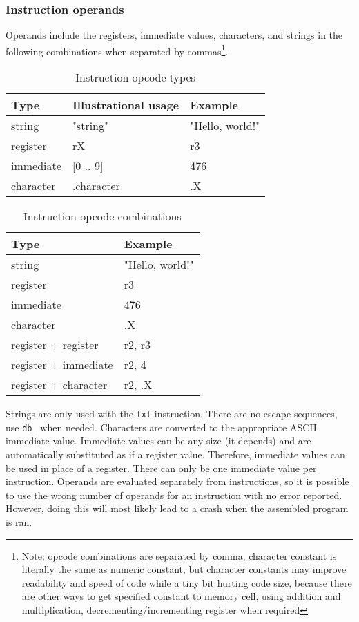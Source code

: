 \documentclass{article}
\begin{document}
\subsubsection{Instruction operands}
\par Operands include the registers, immediate values, characters, and strings in the following combinations when separated by commas\footnote{Note: opcode combinations are separated by comma, character constant is literally the same as numeric constant, but character constants may improve readability and speed of code while a tiny bit hurting code size, because there are other ways to get specified constant to memory cell, using addition and multiplication, decrementing/incrementing register when required}.

\begin{table}[h]
\centering
\caption{Instruction opcode types}
\label{tab:instropcode}
\begin{tabular}{|l|l|l|}
\hline
\textbf{Type} & \textbf{Illustrational usage} & \textbf{Example} \\ \hline
string & "string" & "Hello, world!" \\ \hline
register & rX & r3 \\ \hline
immediate & [0 .. 9] & 476 \\ \hline
character & .character & .X \\ \hline
\end{tabular}
\end{table}

\begin{table}[h]
\centering
\caption{Instruction opcode combinations}
\label{tab:instropcom}
\begin{tabular}{|l|l|}
\hline
\textbf{Type} & \textbf{Example} \\ \hline
string & "Hello, world!" \\ \hline
register & r3 \\ \hline
immediate & 476 \\ \hline
character & .X \\ \hline
register + register & r2, r3 \\ \hline
register + immediate & r2, 4 \\ \hline
register + character & r2, .X \\ \hline
\end{tabular}
\end{table}

\par Strings are only used with the \verb|txt| instruction. There are no escape sequences, use \verb|db_| when needed. Characters are converted to the appropriate ASCII immediate value. Immediate values can be any size (it depends) and are automatically substituted as if a register value. Therefore, immediate values can be used in place of a register. There can only be one immediate value per instruction. Operands are evaluated separately from instructions, so it is possible to use the wrong number of operands for an instruction with no error reported. However, doing this will most likely lead to a crash when the assembled program is ran.
\end{document}
